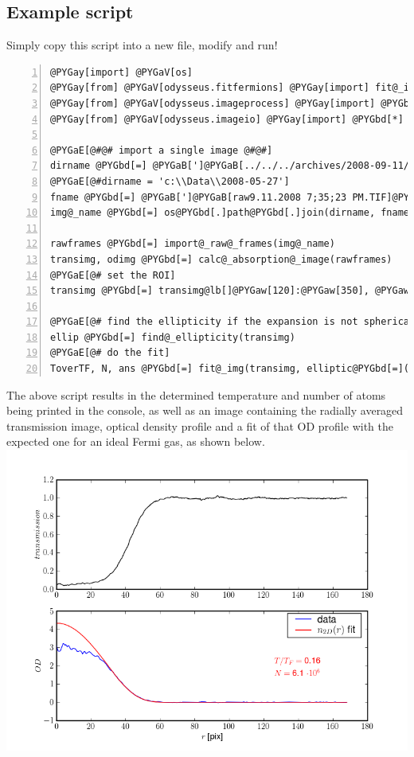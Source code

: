 \documentclass[letterpaper,10pt,english]{manual}
\begin{document}
\subsection{Example script}

Simply copy this script into a new file, modify and run!

\begin{Verbatim}[commandchars=@\[\],numbers=left,firstnumber=1,stepnumber=1]
@PYGay[import] @PYGaV[os]
@PYGay[from] @PYGaV[odysseus.fitfermions] @PYGay[import] fit@_img, find@_ellipticity
@PYGay[from] @PYGaV[odysseus.imageprocess] @PYGay[import] @PYGbd[*]
@PYGay[from] @PYGaV[odysseus.imageio] @PYGay[import] @PYGbd[*]

@PYGaE[@#@# import a single image @#@#]
dirname @PYGbd[=] @PYGaB[']@PYGaB[../../../archives/2008-09-11/]@PYGaB[']
@PYGaE[@#dirname = 'c:\\Data\\2008-05-27']
fname @PYGbd[=] @PYGaB[']@PYGaB[raw9.11.2008 7;35;23 PM.TIF]@PYGaB[']
img@_name @PYGbd[=] os@PYGbd[.]path@PYGbd[.]join(dirname, fname)

rawframes @PYGbd[=] import@_raw@_frames(img@_name)
transimg, odimg @PYGbd[=] calc@_absorption@_image(rawframes)
@PYGaE[@# set the ROI]
transimg @PYGbd[=] transimg@lb[]@PYGaw[120]:@PYGaw[350], @PYGaw[50]:@PYGaw[275]@rb[]

@PYGaE[@# find the ellipticity if the expansion is not spherically symmetric]
ellip @PYGbd[=] find@_ellipticity(transimg)
@PYGaE[@# do the fit]
ToverTF, N, ans @PYGbd[=] fit@_img(transimg, elliptic@PYGbd[=](ellip, @PYGaw[0]))
\end{Verbatim}

The above script results in the determined temperature and number of atoms being printed in the console, as well as an image containing the radially averaged transmission image, optical density profile and a fit of that OD profile with the expected one for an ideal Fermi gas, as shown below.
\includegraphics[width=400pt]{example_fit.png}
\end{document}
